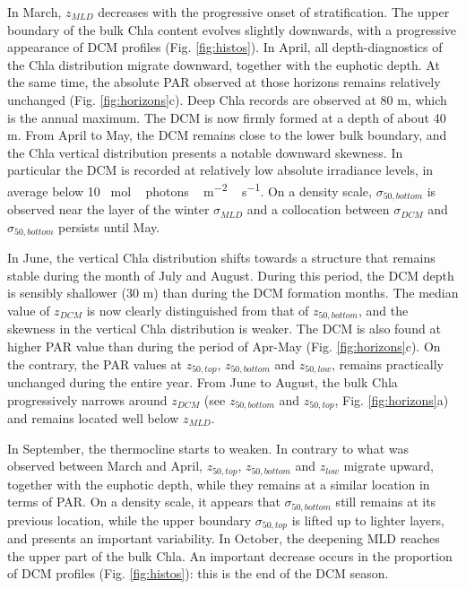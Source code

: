 \documentclass[journal abbreviation, manuscript]{copernicus}
\begin{document}
In March, $z_{MLD}$ decreases with the progressive onset of  stratification.
The upper boundary of the bulk Chla content evolves slightly downwards, with a progressive appearance of DCM profiles (Fig. \ref{fig:histos}).
In April, all depth-diagnostics of the Chla distribution migrate downward, together with the euphotic depth. At the same time, the absolute PAR observed at those horizons remains relatively unchanged (Fig. \ref{fig:horizons}c). Deep Chla records are observed at 80 \unit{m}, which is the annual maximum. The DCM is now firmly formed at a depth of about 40 \unit{m}.
From April to May, the DCM remains close to the lower bulk boundary, and the Chla vertical distribution presents a notable downward skewness. In particular the DCM is recorded at relatively low absolute irradiance levels, in average below 10 \unit{\mu mol \, photons \,m^{-2}\,s^{-1}}.
On a density scale, $\sigma_{50,bottom}$ is observed near the layer of the winter $\sigma_{MLD}$ and a collocation between $\sigma_{DCM}$ and $\sigma_{50,bottom}$ persists until May.

In June, the vertical Chla distribution shifts towards a  structure that remains stable during the month of July and August.
During this period, the DCM depth is sensibly shallower (30 \unit{m}) than during the DCM formation months. The median value of $z_{DCM}$ is now clearly distinguished from that of $z_{50,bottom}$, and the skewness in the vertical Chla distribution is weaker.
The DCM is also found at higher PAR value than during the period of Apr-May (Fig. \ref{fig:horizons}c).
On the contrary, the PAR values at $z_{50,top}$, $z_{50,bottom}$ and $z_{50,low}$, remains practically unchanged during the entire year. From June to August, the bulk Chla progressively narrows around $z_{DCM}$ (see $z_{50,bottom}$ and $z_{50,top}$, Fig. \ref{fig:horizons}a) and remains located well below $z_{MLD}$.

In September, the thermocline starts to weaken. In contrary to what was observed between March and April, $z_{50,top}$, $z_{50,bottom}$ and $z_{low}$ migrate upward, together with the euphotic depth, while they remains at a similar location in terms of PAR.
On a density scale, it appears that $\sigma_{50,bottom}$ still remains at its previous location, while the upper boundary $\sigma_{50,top}$ is lifted up to lighter layers, and presents an important variability. 
In October, the deepening MLD reaches the upper part of the bulk Chla.
An important decrease occurs in the proportion of DCM profiles (Fig. \ref{fig:histos}): this is the end of the DCM season. 
\end{document}
